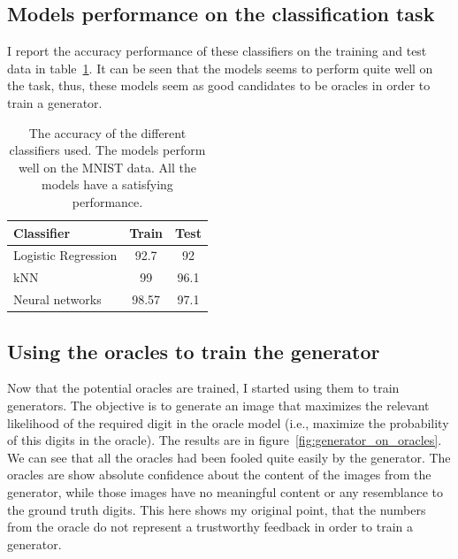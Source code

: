   \subsection{Models performance on the classification task}
    \par I report the accuracy performance of these classifiers on the training and test data in table~\ref{tbl:classifier_performance}. It can be seen that the models seems to perform quite well on the task, thus, these models seem as good candidates to be oracles in order to train a generator.

    \begin{table}[!htbp]
      \centering
      \begin{tabular}{l c c} \hline
        Classifier & Train & Test \\ \hline
        Logistic Regression & 92.7 &  92 \\ %
        kNN & 99 & 96.1 \\ %
        Neural networks & 98.57 & 97.1 \\ \hline
      \end{tabular}
      \caption{The accuracy of the different classifiers used. The models perform well on the MNIST data. All the models have a satisfying performance.}
      \label{tbl:classifier_performance}
    \end{table}

  \subsection{Using the oracles to train the generator}
    \par Now that the potential oracles are trained, I started using them to train generators. The objective is to generate an image that maximizes the relevant likelihood of the required digit in the oracle model (i.e., maximize the probability of this digits in the oracle). The results are in figure~\ref{fig:generator_on_oracles}. We can see that all the oracles had been fooled quite easily by the generator. The oracles are show absolute confidence about the content of the images from the generator, while those images have no meaningful content or any resemblance to the ground truth digits. This here shows my original point, that the numbers from the oracle do not represent a trustworthy feedback in order to train a generator.

